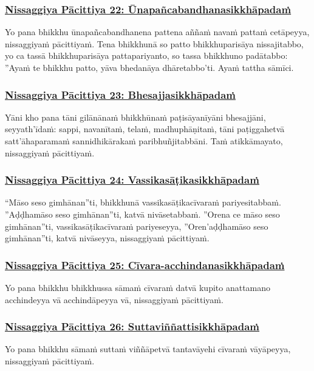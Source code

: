 \subsubsection*{\hyperref[forf-exp22]{Nissaggiya Pācittiya 22: Ūnapañcabandhanasikkhāpadaṁ}}
\label{np22}
Yo pana bhikkhu ūnapañcabandhanena pattena aññaṁ navaṁ pattaṁ cetāpeyya, nissaggiyaṁ pācittiyaṁ. Tena bhikkhunā so patto bhikkhuparisāya nissajitabbo, yo ca tassā bhikkhuparisāya pattapariyanto, so tassa bhikkhuno padātabbo: ''Ayaṁ te bhikkhu patto, yāva bhedanāya dhāretabbo'ti. Ayaṁ tattha sāmīci.

\subsubsection*{\hyperref[forf-exp23]{Nissaggiya Pācittiya 23: Bhesajjasikkhāpadaṁ}}
\label{np23}
Yāni kho pana tāni gilānānaṁ bhikkhūnaṁ paṭisāyanīyāni bhesajjāni, seyyath'īdaṁ: sappi, navanītaṁ, telaṁ, madhuphāṇitaṁ, tāni paṭiggahetvā satt'āhaparamaṁ sannidhikārakaṁ paribhuñjitabbāni. Taṁ atikkāmayato, nissaggiyaṁ pācittiyaṁ.

\subsubsection*{\hyperref[forf-exp24]{Nissaggiya Pācittiya 24: Vassikasāṭikasikkhāpadaṁ}}
\label{np24}
``Māso seso gimhānan''ti, bhikkhunā vassikasāṭikacīvaraṁ pariyesitabbaṁ. ''Aḍḍhamāso seso gimhānan''ti, katvā nivāsetabbaṁ. ''Orena ce māso seso gimhānan''ti, vassikasāṭikacīvaraṁ pariyeseyya, ''Oren'aḍḍhamāso seso gimhānan''ti, katvā nivāseyya, nissaggiyaṁ pācittiyaṁ.

\subsubsection*{\hyperref[forf-exp25]{Nissaggiya Pācittiya 25: Cīvara-acchindanasikkhāpadaṁ}}
\label{np25}
Yo pana bhikkhu bhikkhussa sāmaṁ cīvaraṁ datvā kupito anattamano acchindeyya vā acchindāpeyya vā, nissaggiyaṁ pācittiyaṁ.

\subsubsection*{\hyperref[forf-exp26]{Nissaggiya Pācittiya 26: Suttaviññattisikkhāpadaṁ}}
\label{np26}
Yo pana bhikkhu sāmaṁ suttaṁ viññāpetvā tantavāyehi cīvaraṁ vāyāpeyya, nissaggiyaṁ pācittiyaṁ.

